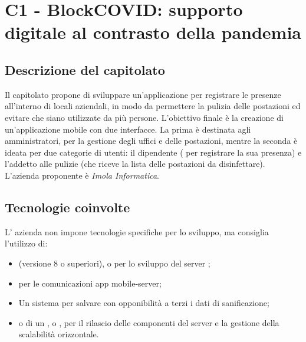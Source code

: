 \section{C1 - BlockCOVID: supporto digitale al contrasto della pandemia}
\subsection{Descrizione del capitolato}
Il capitolato propone di sviluppare un'applicazione per registrare le presenze all'interno di locali aziendali, in modo da permettere la pulizia delle postazioni ed evitare che siano utilizzate da più persone.
L'obiettivo finale è la creazione di un'applicazione mobile con due interfacce. La prima è destinata agli amministratori, per la gestione degli uffici e delle postazioni, mentre la seconda è ideata per due categorie di utenti: il dipendente ( per registrare la sua presenza) e l'addetto alle pulizie (che riceve la lista delle postazioni da disinfettare).\\
L'azienda proponente è \textit{Imola Informatica}.

\subsection{Tecnologie coinvolte}
L' azienda non impone tecnologie specifiche per lo sviluppo, ma consiglia l'utilizzo di:
\begin{itemize}
\item {} (versione 8 o superiori),  o  per lo sviluppo del server ;
\item {} per le comunicazioni app mobile-server;
\item Un sistema  per salvare con opponibilità a terzi i dati di sanificazione;
\item {} o di un ,  o , per il rilascio delle componenti del server e la gestione della scalabilità orizzontale.
\end{itemize}

